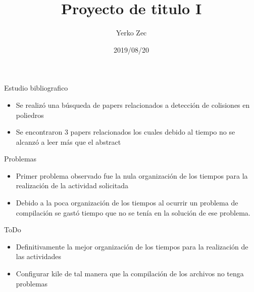 \documentclass{beamer}
\title{Proyecto de titulo I}
\author{Yerko Zec}
\institute[]{FI - UNAB}
\date{2019/08/20}
\begin{document}
\begin{frame}[plain]
  \titlepage
\end{frame}

\addtocounter{framenumber}{-1}

\begin{frame}{Estudio bibliografico}
\begin{itemize}
 \item Se realizó una búsqueda de papers relacionados a detección de colisiones en poliedros 
 \item Se encontraron 3 papers relacionados los cuales debido al tiempo no se alcanzó a leer más que el abstract
\end{itemize}
\end{frame}


\begin{frame}{Problemas}
 \begin{itemize}
  \item Primer problema observado fue la nula organización de los tiempos para la realización de la actividad solicitada
  \item Debido a la poca organización de los tiempos al ocurrir un problema de compilación se gastó tiempo que no se tenía en la solución de ese problema.
 \end{itemize}

\end{frame}


\begin{frame}{ToDo}
\begin{itemize}
 \item Definitivamente la mejor organización de los tiempos para la realización de las actividades
 \item Configurar kile de tal manera que la compilación de los archivos no tenga problemas
\end{itemize}
\end{frame}
\end{document}

